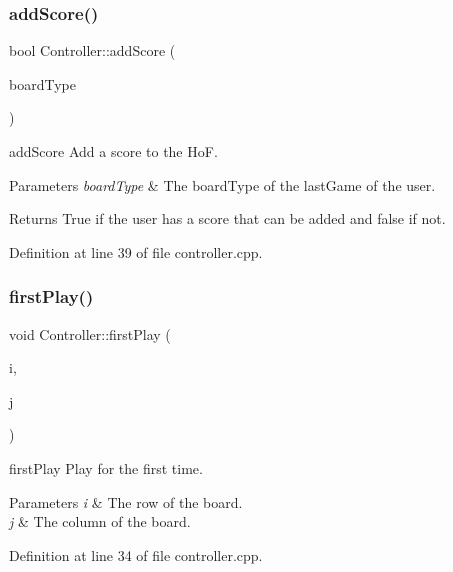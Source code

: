 \subsubsection{\texorpdfstring{add\+Score()}{addScore()}}
{\footnotesize\ttfamily bool Controller\+::add\+Score (\begin{DoxyParamCaption}\item[{const \hyperlink{struct_board_type}{Board\+Type} \&}]{board\+Type }\end{DoxyParamCaption})}



add\+Score Add a score to the HoF. 


\begin{DoxyParams}{Parameters}
{\em board\+Type} & The board\+Type of the last\+Game of the user. \\
\hline
\end{DoxyParams}
\begin{DoxyReturn}{Returns}
True if the user has a score that can be added and false if not. 
\end{DoxyReturn}


Definition at line 39 of file controller.\+cpp.

\mbox{\label{class_controller_ae83a66c83bfa72f2995aaa8ae1f23cfa}} 
\subsubsection{\texorpdfstring{first\+Play()}{firstPlay()}}
{\footnotesize\ttfamily void Controller\+::first\+Play (\begin{DoxyParamCaption}\item[{int}]{i,  }\item[{int}]{j }\end{DoxyParamCaption})}



first\+Play Play for the first time. 


\begin{DoxyParams}{Parameters}
{\em i} & The row of the board. \\
\hline
{\em j} & The column of the board. \\
\hline
\end{DoxyParams}


Definition at line 34 of file controller.\+cpp.

\mbox{\label{class_controller_aa6f9cab2dd64ec7f93e4834bf44ca4a7}} 

